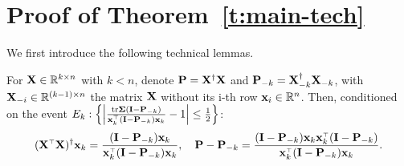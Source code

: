 \documentclass[thesis.tex]{subfiles}
\begin{document}




% 


\section{Proof of Theorem~\ref{t:main-tech}}
\label{sec:proof-of-theo-main-tech}

We first introduce the following technical lemmas.

\begin{lemma}\label{l:rank-one-update}
    For $\mathbf X \in \mathbb R^{k \times n}$ with $k<n$, denote $\mathbf P = \mathbf X^\dagger \mathbf X$ and $\mathbf P_{-k} = \mathbf X_{-k}^\dagger \mathbf X_{-k}$, with $\mathbf X_{-i} \in \mathbb R^{(k-1) \times n}$ the matrix $\mathbf X$ without its i-th row $\mathbf x_i \in \mathbb R^n$. Then, conditioned on the event $E_k: \left\{ \left| \frac{\tr \Sigmab (\I - \P_{-k})}{\x_k^\top (\I - \P_{-k}) \x_k} - 1 \right| \le \frac12 \right\}$:
    \begin{align*}
      (\X^\top\X)^\dagger\x_k = \frac{(\I - \P_{-k}) \x_k}{\x_k^\top (\I - \P_{-k}) \x_k}, \quad \P - \P_{-k} = \frac{(\I - \P_{-k}) \x_k \x_k^\top (\I - \P_{-k}) }{\x_k^\top (\I - \P_{-k}) \x_k}.
    \end{align*}
\end{lemma}
\end{document}
